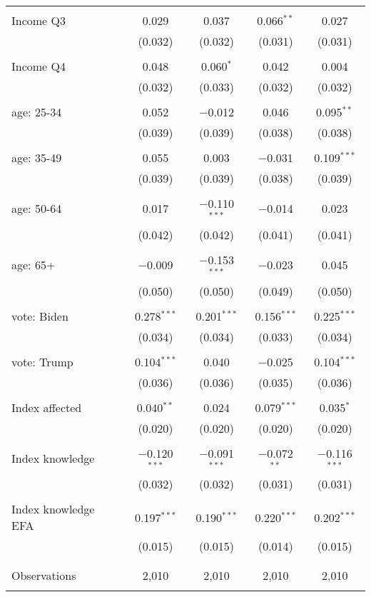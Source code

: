\begin{tabular}{@{\extracolsep{5pt}}lcccc}
  & & & & \\ 
 Income Q3 & 0.029 & 0.037 & 0.066$^{**}$ & 0.027 \\ 
  & (0.032) & (0.032) & (0.031) & (0.031) \\ 
  & & & & \\ 
 Income Q4 & 0.048 & 0.060$^{*}$ & 0.042 & 0.004 \\ 
  & (0.032) & (0.033) & (0.032) & (0.032) \\ 
  & & & & \\ 
 age: 25-34 & 0.052 & $-$0.012 & 0.046 & 0.095$^{**}$ \\ 
  & (0.039) & (0.039) & (0.038) & (0.038) \\ 
  & & & & \\ 
 age: 35-49 & 0.055 & 0.003 & $-$0.031 & 0.109$^{***}$ \\ 
  & (0.039) & (0.039) & (0.038) & (0.039) \\ 
  & & & & \\ 
 age: 50-64 & 0.017 & $-$0.110$^{***}$ & $-$0.014 & 0.023 \\ 
  & (0.042) & (0.042) & (0.041) & (0.041) \\ 
  & & & & \\ 
 age: 65+ & $-$0.009 & $-$0.153$^{***}$ & $-$0.023 & 0.045 \\ 
  & (0.050) & (0.050) & (0.049) & (0.050) \\ 
  & & & & \\ 
 vote: Biden & 0.278$^{***}$ & 0.201$^{***}$ & 0.156$^{***}$ & 0.225$^{***}$ \\ 
  & (0.034) & (0.034) & (0.033) & (0.034) \\ 
  & & & & \\ 
 vote: Trump & 0.104$^{***}$ & 0.040 & $-$0.025 & 0.104$^{***}$ \\ 
  & (0.036) & (0.036) & (0.035) & (0.036) \\ 
  & & & & \\ 
 Index affected & 0.040$^{**}$ & 0.024 & 0.079$^{***}$ & 0.035$^{*}$ \\ 
  & (0.020) & (0.020) & (0.020) & (0.020) \\ 
  & & & & \\ 
 Index knowledge & $-$0.120$^{***}$ & $-$0.091$^{***}$ & $-$0.072$^{**}$ & $-$0.116$^{***}$ \\ 
  & (0.032) & (0.032) & (0.031) & (0.031) \\ 
  & & & & \\ 
 Index knowledge EFA & 0.197$^{***}$ & 0.190$^{***}$ & 0.220$^{***}$ & 0.202$^{***}$ \\ 
  & (0.015) & (0.015) & (0.014) & (0.015) \\ 
  & & & & \\ 
\hline \\[-1.8ex] 

Observations & 2,010 & 2,010 & 2,010 & 2,010 \\ 
\hline 
\hline \\[-1.8ex] 
\end{tabular} 